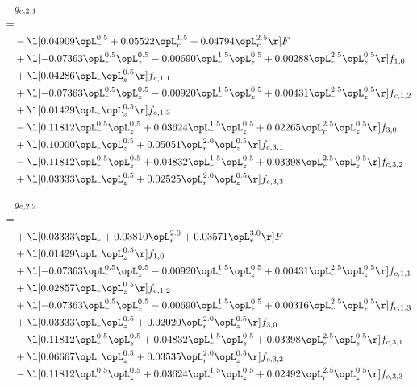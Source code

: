 \begin{alignat}{2} 
\label{eq:g_21_0} 
& g_{c,2,1} \nonumber \\ 
 = \\ 
& - \l[  0.04909 \opL_r^{0.5} +  0.05522 \opL_r^{1.5} +  0.04794 \opL_r^{2.5}  \r] F \nonumber \\ 
& + \l[  -0.07363 \opL_r^{0.5} \opL_z^{0.5}   -0.00690 \opL_r^{1.5} \opL_z^{0.5} +  0.00288 \opL_r^{2.5} \opL_z^{0.5}  \r] f_{1,0} \nonumber \\ 
& + \l[  0.04286 \opL_r \opL_z^{0.5}  \r] f_{c,1,1} \nonumber \\ 
& + \l[  -0.07363 \opL_r^{0.5} \opL_z^{0.5}   -0.00920 \opL_r^{1.5} \opL_z^{0.5} +  0.00431 \opL_r^{2.5} \opL_z^{0.5}  \r] f_{c,1,2} \nonumber \\ 
& + \l[  0.01429 \opL_r \opL_z^{0.5}  \r] f_{c,1,3} \nonumber \\ 
& - \l[  0.11812 \opL_r^{0.5} \opL_z^{0.5} +  0.03624 \opL_r^{1.5} \opL_z^{0.5} +  0.02265 \opL_r^{2.5} \opL_z^{0.5}  \r] f_{3,0} \nonumber \\ 
& + \l[  0.10000 \opL_r \opL_z^{0.5} +  0.05051 \opL_r^{2.0} \opL_z^{0.5}  \r] f_{c,3,1} \nonumber \\ 
& - \l[  0.11812 \opL_r^{0.5} \opL_z^{0.5} +  0.04832 \opL_r^{1.5} \opL_z^{0.5} +  0.03398 \opL_r^{2.5} \opL_z^{0.5}  \r] f_{c,3,2} \nonumber \\ 
& + \l[  0.03333 \opL_r \opL_z^{0.5} +  0.02525 \opL_r^{2.0} \opL_z^{0.5}  \r] f_{c,3,3} \nonumber \\ 
\end{alignat} 


\begin{alignat}{2} 
\label{eq:g_22_0} 
& g_{c,2,2} \nonumber \\ 
 = \\ 
& + \l[  0.03333 \opL_r +  0.03810 \opL_r^{2.0} +  0.03571 \opL_r^{3.0}  \r] F \nonumber \\ 
& + \l[  0.01429 \opL_r \opL_z^{0.5}  \r] f_{1,0} \nonumber \\ 
& + \l[  -0.07363 \opL_r^{0.5} \opL_z^{0.5}   -0.00920 \opL_r^{1.5} \opL_z^{0.5} +  0.00431 \opL_r^{2.5} \opL_z^{0.5}  \r] f_{c,1,1} \nonumber \\ 
& + \l[  0.02857 \opL_r \opL_z^{0.5}  \r] f_{c,1,2} \nonumber \\ 
& + \l[  -0.07363 \opL_r^{0.5} \opL_z^{0.5}   -0.00690 \opL_r^{1.5} \opL_z^{0.5} +  0.00316 \opL_r^{2.5} \opL_z^{0.5}  \r] f_{c,1,3} \nonumber \\ 
& + \l[  0.03333 \opL_r \opL_z^{0.5} +  0.02020 \opL_r^{2.0} \opL_z^{0.5}  \r] f_{3,0} \nonumber \\ 
& - \l[  0.11812 \opL_r^{0.5} \opL_z^{0.5} +  0.04832 \opL_r^{1.5} \opL_z^{0.5} +  0.03398 \opL_r^{2.5} \opL_z^{0.5}  \r] f_{c,3,1} \nonumber \\ 
& + \l[  0.06667 \opL_r \opL_z^{0.5} +  0.03535 \opL_r^{2.0} \opL_z^{0.5}  \r] f_{c,3,2} \nonumber \\ 
& - \l[  0.11812 \opL_r^{0.5} \opL_z^{0.5} +  0.03624 \opL_r^{1.5} \opL_z^{0.5} +  0.02492 \opL_r^{2.5} \opL_z^{0.5}  \r] f_{c,3,3} \nonumber \\ 
\end{alignat} 


